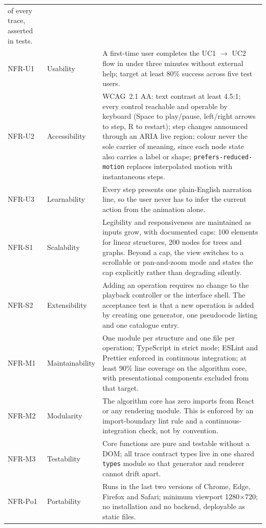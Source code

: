 \documentclass[11pt,a4paper]{article}
\newcommand{\ct}[1]{\texttt{#1}}
\begin{document}
{\begin{longtable}{@{}L{1.3cm}L{2.5cm}L{11.2cm}@{}}
of every trace, asserted in tests. \\
NFR-U1 & Usability & A first-time user completes the UC1 $\rightarrow$ UC2 flow in under
three minutes without external help; target at least 80\% success across five test users. \\
NFR-U2 & Accessibility & WCAG~2.1 AA: text contrast at least 4.5:1; every control reachable
and operable by keyboard (Space to play/pause, left/right arrows to step, R to restart);
step changes announced through an ARIA live region; colour never the sole carrier of
meaning, since each node state also carries a label or shape; \ct{prefers-reduced-motion}
replaces interpolated motion with instantaneous steps. \\
NFR-U3 & Learnability & Every step presents one plain-English narration line, so the user
never has to infer the current action from the animation alone. \\
NFR-S1 & Scalability & Legibility and responsiveness are maintained as inputs grow, with
documented caps: 100 elements for linear structures, 200 nodes for trees and graphs.
Beyond a cap, the view switches to a scrollable or pan-and-zoom mode and states the cap
explicitly rather than degrading silently. \\
NFR-S2 & Extensibility & Adding an operation requires no change to the playback controller
or the interface shell. The acceptance test is that a new operation is added by creating
one generator, one pseudocode listing and one catalogue entry. \\
NFR-M1 & Maintainability & One module per structure and one file per operation; TypeScript
in strict mode; ESLint and Prettier enforced in continuous integration; at least 90\% line
coverage on the algorithm core, with presentational components excluded from that target. \\
NFR-M2 & Modularity & The algorithm core has zero imports from React or any rendering
module. This is enforced by an import-boundary lint rule and a continuous-integration
check, not by convention. \\
NFR-M3 & Testability & Core functions are pure and testable without a DOM; all trace
contract types live in one shared \ct{types} module so that generator and renderer cannot
drift apart. \\
NFR-Po1 & Portability & Runs in the last two versions of Chrome, Edge, Firefox and Safari;
minimum viewport 1280$\times$720; no installation and no backend, deployable as static
files. \\

\end{longtable}}
\end{document}
